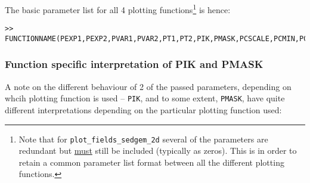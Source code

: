 \documentclass[11pt,fleqn]{book} %
\begin{document}
\vspace{1mm}
The basic parameter list for all 4 plotting functions\footnote{Note that for \texttt{plot\_fields\_sedgem\_2d} several of the parameters are redundant but \uline{must} still be included (typically as zeros). This is in order to retain a common parameter list format between all the different plotting functions.} is hence:
\footnotesize
\vspace{-4pt}\begin{verbatim}
>> FUNCTIONNAME(PEXP1,PEXP2,PVAR1,PVAR2,PT1,PT2,PIK,PMASK,PCSCALE,PCMIN,PCMAX,PCN,PDATA,POPT,PNAME);
\end{verbatim}\vspace{-4pt}
\normalsize

\subsubsection{Function specific interpretation of PIK and PMASK}

A note on the different behaviour of 2 of the passed parameters, depending on whcih plotting function is used -- \texttt{PIK}, and to some extent, \texttt{PMASK}, have quite different interpretations depending on the particular plotting function used:
\end{document}
